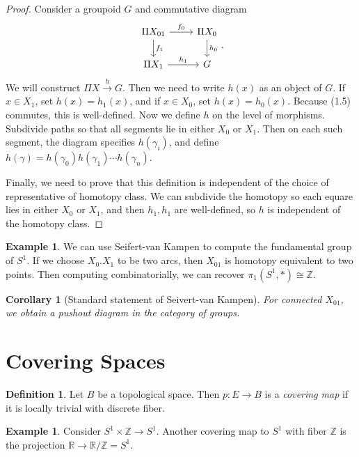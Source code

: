 \documentclass[leqno, openany]{memoir}
\newtheorem{cor}[thm]{Corollary}
\theoremstyle{definition}
\newtheorem{defn}[thm]{Definition}
\newtheorem{exm}[thm]{Example}
\theoremstyle{remark}
\theoremstyle{plain}
\theoremstyle{definition}
\theoremstyle{remark}
\newcommand{\R}{\mathbb{R}}
\newcommand{\Z}{\mathbb{Z}}
\begin{document}
\begin{proof}
    Consider a groupoid $G$ and commutative diagram
\begin{equation}
\begin{tikzcd}
    \Pi X_{01} \arrow{r}{f_0} \arrow{d}{f_1} & \Pi X_0 \arrow{d}{h_0} \\
    \Pi X_1 \arrow{r}{h_1} & G
\end{tikzcd}.
\end{equation}
We will construct $\Pi X \xrightarrow{h} G$. Then we need to write $h(x)$ as an object of $G$. If $x \in X_1$, set $h(x) = h_1(x)$, and if $x \in X_0$, set $h(x) = h_0(x)$. Because (1.5) commutes, this is well-defined. Now we define $h$ on the level of morphisms. Subdivide paths so that all segments lie in either $X_0$ or $X_1$. Then on each such segment, the diagram specifies $h(\gamma_i)$, and define $h(\gamma) = h(\gamma_0) h(\gamma_1) \cdots h(\gamma_n)$.

Finally, we need to prove that this definition is independent of the choice of representative of homotopy class. We can subdivide the homotopy so each equare lies in either $X_0$ or $X_1$, and then $h_1, h_1$ are well-defined, so $h$ is independent of the homotopy class.
\end{proof}

\begin{exm}
    We can use Seifert-van Kampen to compute the fundamental group of $S^1$. If we choose $X_0. X_1$ to be two arcs, then $X_{01}$ is homotopy equivalent to two points. Then computing combinatorially, we can recover $\pi_1(S^1, *) \cong \Z$.
\end{exm}

\begin{cor}[Standard statement of Seivert-van Kampen]
    For connected $X_{01}$, we obtain a pushout diagram in the category of \textit{groups}. 
\end{cor}

\section{Covering Spaces}%
\label{sec:covering_spaces}

\begin{defn}
Let $B$ be a topological space. Then $p:E \to B$ is a \textit{covering map} if it is locally trivial with discrete fiber. 
\end{defn}

\begin{exm}
    Consider $S^1 \times \Z \to S^1$. Another covering map to $S^1$ with fiber $\Z$ is the projection $\R \to \R / \Z = S^1$.
\end{exm}
\end{document}
